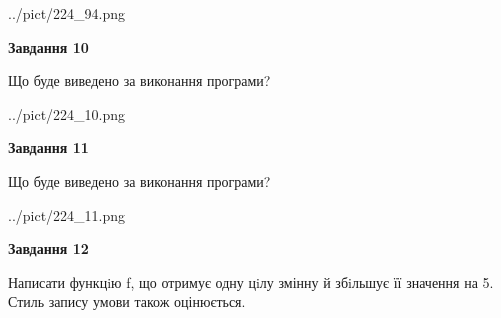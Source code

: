 \documentclass[12pt, ukrainian]{article}
\begin{document}
{\begin {large}
\begin{center}
	{../pict/224_94.png}
\end{center}
\newpage

{\begin {center}\textbf{Завдання 10}\end {center}}

Що буде виведено за виконання програми?\par
\begin{center}
	{../pict/224_10.png}
\end{center}
\newpage

{\begin {center}\textbf{Завдання 11}\end {center}}

Що буде виведено за виконання програми?\par
\begin{center}
	{../pict/224_11.png}
\end{center}
\newpage

{\begin {center}\textbf{Завдання 12}\end {center}}


Написати функцiю f, що отримує одну цiлу змінну й збiльшує її значення на 5. Стиль запису умови також оцінюється.\par
\newpage

\end {large}}
\end{document}
